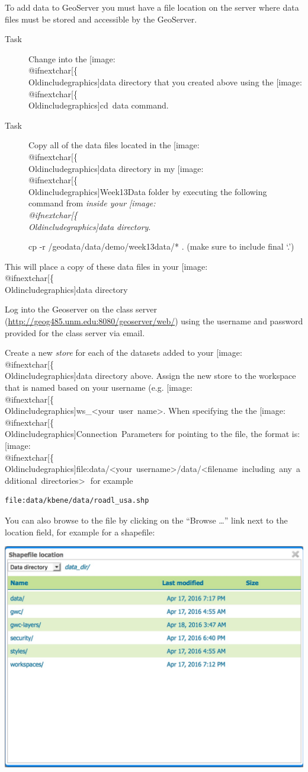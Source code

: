 \documentclass[]{book}
\makeatletter
\providecommand{\tightlist}{%
  \setlength{\itemsep}{0pt}\setlength{\parskip}{0pt}}
\def\ScaleIfNeeded{%
  \ifdim\Gin@nat@width>.5\linewidth
    .5\linewidth
  \else
    \Gin@nat@width
  \fi
}
\let\Oldincludegraphics\texttt{[image: \%
 \\catcode`\\@=11\\relax\%
 \%\\gdef\\includegraphics\{\\@ifnextchar[\{\\Oldincludegraphics]}{\Oldincludegraphics[width=\ScaleIfNeeded]}}%
\gdef\texttt{[image: \\@ifnextchar[\{\\Oldincludegraphics]}{\Oldincludegraphics[max size={.75\textwidth}{.75\textheight}]}}%
\makeatother
\begin{document}
To add data to GeoServer you must have a file location on the server
where data files must be stored and accessible by the GeoServer.

\begin{description}
\item[Task]
Change into the \texttt{data} directory that you created above using the
\texttt{cd\ data} command.
\item[Task]
Copy all of the data files located in the \texttt{data} directory in my
\texttt{Week13Data} folder by executing the following command from
\emph{inside your \texttt{data} directory}.

cp -r /geodata/data/demo/week13data/* . (make sure to include final `.')
\end{description}

This will place a copy of these data files in your \texttt{data}
directory

\begin{description}
\tightlist
\item[Task]
Log into the Geoserver on the class server
(\url{http://geog485.unm.edu:8080/geoserver/web/}) using the username
and password provided for the class server via email.
\end{description}

Create a new \emph{store} for each of the datasets added to your
\texttt{data} directory above. Assign the new store to the workspace
that is named based on your username (e.g.
\texttt{ws\_\textless{}your\ user\ name\textgreater{}}. When specifying
the the \texttt{Connection\ Parameters} for pointing to the file, the
format is:
\texttt{file:data/\textless{}your\ username\textgreater{}/data/\textless{}filename\ including\ any\ additional\ directories\textgreater{}} 
for example

\begin{verbatim}
file:data/kbene/data/roadl_usa.shp
\end{verbatim}

You can also browse to the file by clicking on the ``Browse \ldots{}''
link next to the location field, for example for a shapefile:

\includegraphics{images/GeoServer_Browse.jpg}~
\end{document}
